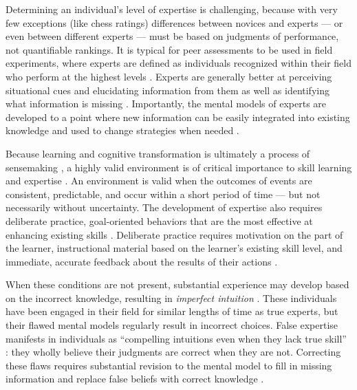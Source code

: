 Determining an individual's level of expertise is challenging, because with very few exceptions (like chess ratings) differences between novices and experts --- or even between different experts --- must be based on judgments of performance, not quantifiable rankings. It is typical for peer assessments to be used in field experiments, where experts are defined as individuals recognized within their field who perform at the highest levels \citep{Kahneman2009}. Experts are generally better at perceiving situational cues and elucidating information from them \citep{Nee2006, Klein1999} as well as identifying what information is missing \citep{Klein1992}. Importantly, the mental models of experts are developed to a point where new information can be easily integrated into existing knowledge and used to change strategies when needed \citep{Glaser1996}.

Because learning and cognitive transformation is ultimately a process of sensemaking \citep{Klein2006}, a highly valid environment is of critical importance to skill learning and expertise \citep{Kahneman2009}. An environment is valid when the outcomes of events are consistent, predictable, and occur within a short period of time --- but not necessarily without uncertainty. The development of expertise also requires deliberate practice, goal-oriented behaviors that are the most effective at enhancing existing skills \citep{Ericsson2008}. Deliberate practice requires motivation on the part of the learner, instructional material based on the learner's existing skill level, and immediate, accurate feedback about the results of their actions \citep{Ericsson1993}.

When these conditions are not present, substantial experience may develop based on the incorrect knowledge, resulting in \emph{imperfect intuition} \citep{Kahneman2009}. These individuals have been engaged in their field for similar lengths of time as true experts, but their flawed mental models regularly result in incorrect choices. False expertise manifests in individuals as ``compelling intuitions even when they lack true skill'' \citep{Kahneman2009}: they wholly believe their judgments are correct when they are not. Correcting these flaws requires substantial revision to the mental model to fill in missing information and replace false beliefs with correct knowledge \citep{Klein2006, Chi2008}.

